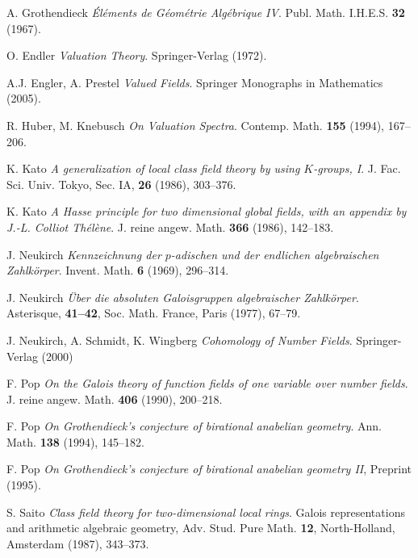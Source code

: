 \begin{thebibliography}{999999}

    A. Grothendieck
    \textit{Éléments de Géométrie Algébrique IV}.
    Publ. Math. I.H.E.S. \textbf{32} (1967).
    
    O. Endler
    \textit{Valuation Theory}.
    Springer-Verlag (1972).

    A.J. Engler, A. Prestel
    \textit{Valued Fields}.
    Springer Monographs in Mathematics (2005).
    
    R. Huber, M. Knebusch
    \textit{On Valuation Spectra}.
    Contemp. Math. \textbf{155} (1994), 167\---206.
    
    K. Kato
    \textit{A generalization of local class field theory by using $K$-groups, I}.
    J. Fac. Sci. Univ. Tokyo, Sec. IA, \textbf{26} (1986), 303\---376.

    K. Kato
    \textit{A Hasse principle for two dimensional global fields, with an appendix by J.-L. Colliot Thélène}.
    J. reine angew. Math. \textbf{366} (1986), 142\---183.
       
    J. Neukirch
    \textit{Kennzeichnung der $p$-adischen und der endlichen algebraischen Zahlkörper}.
    Invent. Math. \textbf{6} (1969), 296\---314.
    
    J. Neukirch
    \textit{Über die absoluten Galoisgruppen algebraischer Zahlkörper}. Asterisque, \textbf{41\---42}, Soc. Math. France, Paris (1977), 67\---79.
    
    J. Neukirch, A. Schmidt, K. Wingberg
    \textit{Cohomology of Number Fields}.
    Springer-Verlag (2000)
    
    F. Pop
    \textit{On the Galois theory of function fields of one variable over number fields}.
    J. reine angew. Math. \textbf{406} (1990), 200\---218.

    F. Pop
    \textit{On Grothendieck's conjecture of birational anabelian geometry}.
    Ann. Math. \textbf{138} (1994), 145\---182.

    F. Pop
    \textit{On Grothendieck's conjecture of birational anabelian geometry II}, Preprint (1995).
    
    S. Saito
    \textit{Class field theory for two-dimensional local rings}.
    Galois representations and arithmetic algebraic geometry,
    Adv. Stud. Pure Math. \textbf{12}, North-Holland, Amsterdam (1987), 343\---373.
    

\end{thebibliography}
